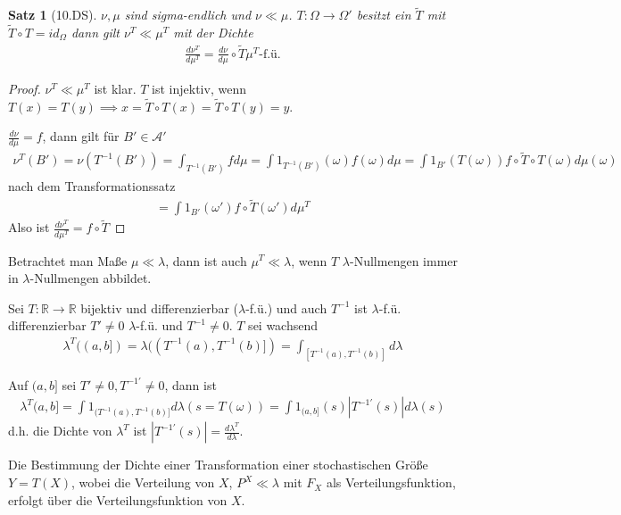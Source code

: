 \documentclass[]{article}
\newtheorem{theorem}{Satz}
\begin{document}
\begin{theorem}[10.DS]
	$\nu,\mu$ sind sigma-endlich und $\nu \ll \mu$. $T:\Omega\rightarrow\Omega'$ besitzt ein $\tilde{T}$ mit $\tilde{T}\circ T = id_{\Omega}$ dann gilt $\nu^T \ll \mu^T$ mit der Dichte
	\begin{align*}
		\frac{d\nu^T}{d\mu^T} = \frac{d\nu}{d\mu} \circ \tilde{T} \mu^T\text{-f.ü.}
	\end{align*}
\end{theorem}

\begin{proof}
	$\nu^T \ll \mu^T$ ist klar. $T$ ist injektiv, wenn $T(x) = T(y) \implies x = \tilde{T}\circ T(x) = \tilde{T}\circ T(y) = y$.
	
	$\frac{d\nu}{d\mu} = f$, dann gilt für $B' \in \mathcal{A}'$
	\begin{align*}
		\nu^T(B') = \nu(T^{-1}(B')) = \int_{T^{-1}(B')} f d\mu = \int 1_{T^{-1}(B')}(\omega) f(\omega) d\mu = \int 1_{B'}(T(\omega)) f \circ \tilde{T} \circ T(\omega) d\mu(\omega)
	\end{align*}
	nach dem Transformationssatz
	\begin{align*}
		= \int 1_{B'} (\omega') f\circ \tilde{T}(\omega') d\mu^T
	\end{align*}
	Also ist $\frac{d\nu^T}{d\mu^T} = f \circ \tilde{T}$
\end{proof}

Betrachtet man Maße $\mu \ll \lambda$, dann ist auch $\mu^T \ll \lambda$, wenn $T$ $\lambda$-Nullmengen immer in $\lambda$-Nullmengen abbildet.

Sei $T:\mathbb{R}\rightarrow\mathbb{R}$ bijektiv und differenzierbar ($\lambda$-f.ü.) und auch $T^{-1}$ ist $\lambda$-f.ü. differenzierbar $T' \neq 0$ $\lambda$-f.ü. und $T^{-1} \neq 0$. $T$ sei wachsend
\begin{align*}
	\lambda^T((a,b]) = \lambda((T^{-1}(a), T^{-1}(b)]) = \int_{[T^{-1}(a),T^{-1}(b)]} d\lambda
\end{align*}

Auf $(a,b]$ sei $T'\neq 0, T^{-1'} \neq 0$, dann ist
\begin{align*}
	\lambda^T(a,b] = \int 1_{(T^{-1}(a),T^{-1}(b)]} d\lambda (s=T(\omega)) = \int 1_{(a,b]}(s) |T^{-1'}(s)| d\lambda(s)
\end{align*}
d.h. die Dichte von $\lambda^T$ ist $|T^{-1'}(s)|=\frac{d\lambda^T}{d\lambda}$.

Die Bestimmung der Dichte einer Transformation einer stochastischen Größe $Y=T(X)$, wobei die Verteilung von $X$, $P^X \ll \lambda$ mit $F_X$ als Verteilungsfunktion, erfolgt über die Verteilungsfunktion von $X$.
\end{document}
